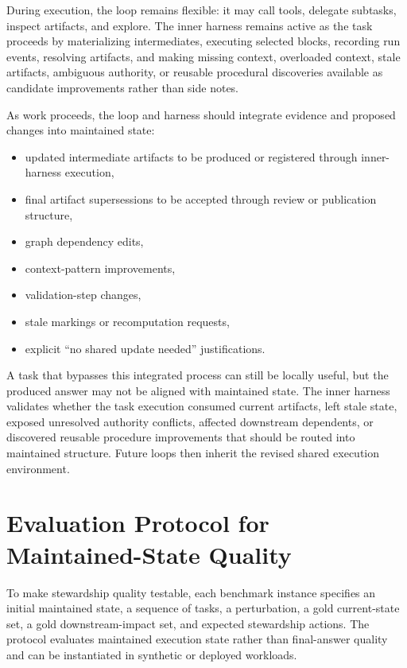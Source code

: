 \documentclass{article}
\begin{document}
During execution, the loop remains flexible: it may call tools, delegate subtasks, inspect artifacts, and explore. The inner harness remains active as the task proceeds by materializing intermediates, executing selected blocks, recording run events, resolving artifacts, and making missing context, overloaded context, stale artifacts, ambiguous authority, or reusable procedural discoveries available as candidate improvements rather than side notes.

As work proceeds, the loop and harness should integrate evidence and proposed changes into maintained state:
\begin{itemize}[leftmargin=*]
\item updated intermediate artifacts to be produced or registered through inner-harness execution,
\item final artifact supersessions to be accepted through review or publication structure,
\item graph dependency edits,
\item context-pattern improvements,
\item validation-step changes,
\item stale markings or recomputation requests,
\item explicit ``no shared update needed'' justifications.
\end{itemize}

A task that bypasses this integrated process can still be locally useful, but the produced answer may not be aligned with maintained state. The inner harness validates whether the task execution consumed current artifacts, left stale state, exposed unresolved authority conflicts, affected downstream dependents, or discovered reusable procedure improvements that should be routed into maintained structure. Future loops then inherit the revised shared execution environment.

\section{Evaluation Protocol for Maintained-State Quality}
\label{sec:evaluation-protocol}

To make stewardship quality testable, each benchmark instance specifies an initial maintained state, a sequence of tasks, a perturbation, a gold current-state set, a gold downstream-impact set, and expected stewardship actions. The protocol evaluates maintained execution state rather than final-answer quality and can be instantiated in synthetic or deployed workloads.
\end{document}
